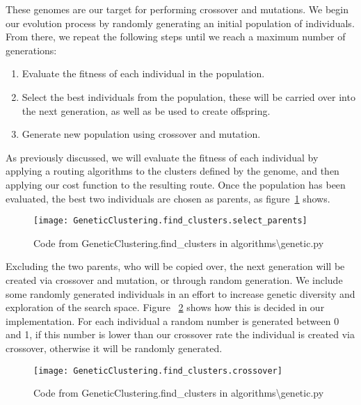 \noindent
These genomes are our target for performing crossover and mutations.
We begin our evolution process by randomly generating an initial population of individuals.
From there, we repeat the following steps until we reach a maximum number of generations:
\begin{enumerate}
    \item Evaluate the fitness of each individual in the population.
    \item Select the best individuals from the population, these will be carried over into the next generation, as
    well as be used to create offspring.
    \item Generate new population using crossover and mutation.
\end{enumerate}

\noindent
As previously discussed, we will evaluate the fitness of each individual by applying a routing algorithms to the
clusters defined by the genome, and then applying our cost function to the resulting route.
Once the population has been evaluated, the best two individuals are chosen as parents, as figure~\ref{fig:GeneticClustering.find_clusters.select_parents}
shows.
\begin{figure}[H]
    \centering
    \texttt{[image: GeneticClustering.find\_clusters.select\_parents]}
    \caption{Code from GeneticClustering.find\_clusters in algorithms\textbackslash genetic.py}\label{fig:GeneticClustering.find_clusters.select_parents}
\end{figure}

\noindent
Excluding the two parents, who will be copied over, the next generation will be created via crossover and mutation,
or through random generation.
We include some randomly generated individuals in an effort to increase genetic diversity and exploration of the
search space.
Figure ~\ref{fig:GeneticClustering.find_clusters.crossover} shows how this is decided in our implementation.
For each individual a random number is generated between 0 and 1, if this number is lower than our crossover rate
the individual is created via crossover, otherwise it will be randomly generated.
\begin{figure}[H]
    \centering
    \texttt{[image: GeneticClustering.find\_clusters.crossover]}
    \caption{Code from GeneticClustering.find\_clusters in algorithms\textbackslash genetic.py}\label{fig:GeneticClustering.find_clusters.crossover}
\end{figure}


